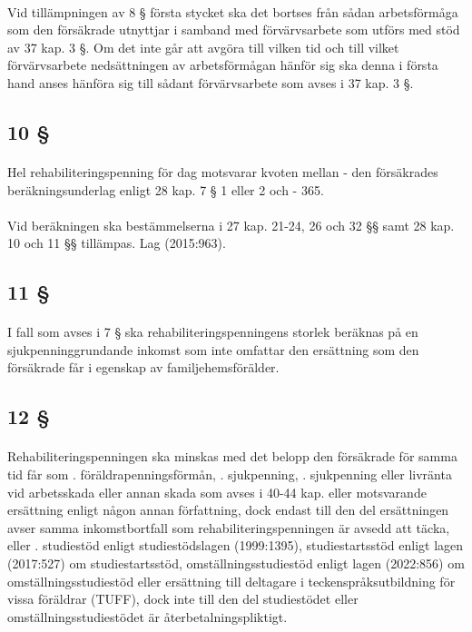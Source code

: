 \documentclass[a4paper,notitlepage,openany,10pt]{book}
\begin{document}
\paragraph*{}
Vid tillämpningen av 8 § första stycket ska det bortses från sådan arbetsförmåga som den försäkrade utnyttjar i samband med förvärvsarbete som utförs med stöd av 37 kap. 3 §. Om det inte går att avgöra till vilken tid och till vilket förvärvsarbete nedsättningen av arbetsförmågan hänför sig ska denna i första hand anses hänföra sig till sådant förvärvsarbete som avses i 37 kap. 3 §.
\subsection*{10 §}
\paragraph*{}
Hel rehabiliteringspenning för dag motsvarar kvoten mellan
\newline - den försäkrades beräkningsunderlag enligt 28 kap. 7 § 1 eller 2 och
\newline - 365.
\paragraph*{}
Vid beräkningen ska bestämmelserna i 27 kap. 21-24, 26 och 32 §§ samt 28 kap. 10 och 11 §§ tillämpas.
Lag (2015:963).
\subsection*{11 §}
\paragraph*{}
I fall som avses i 7 § ska rehabiliteringspenningens storlek beräknas på en sjukpenninggrundande inkomst som inte omfattar den ersättning som den försäkrade får i egenskap av familjehemsförälder.
\subsection*{12 §}
\paragraph*{}
Rehabiliteringspenningen ska minskas med det belopp den försäkrade för samma tid får som
. föräldrapenningsförmån,
. sjukpenning,
. sjukpenning eller livränta vid arbetsskada eller annan skada som avses i 40-44 kap. eller motsvarande ersättning enligt någon annan författning, dock endast till den del ersättningen avser samma inkomstbortfall som rehabiliteringspenningen är avsedd att täcka, eller
. studiestöd enligt studiestödslagen (1999:1395), studiestartsstöd enligt lagen (2017:527) om studiestartsstöd, omställningsstudiestöd enligt lagen (2022:856) om omställningsstudiestöd eller ersättning till deltagare i teckenspråksutbildning för vissa föräldrar (TUFF), dock inte till den del studiestödet eller omställningsstudiestödet är återbetalningspliktigt.
\end{document}

